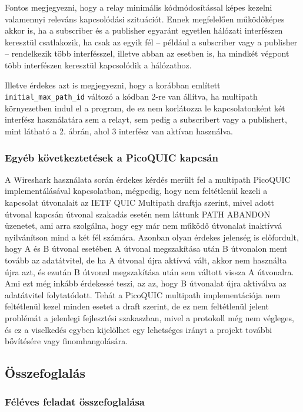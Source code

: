 \documentclass[a4paper,oneside]{article}
\begin{document}
Fontos megjegyezni, hogy a relay minimális kódmódosítással képes kezelni valamennyi 
releváns kapcsolódási szituációt. Ennek megfelelően működőképes akkor is, ha a subscriber és a 
publisher egyaránt egyetlen hálózati interfészen keresztül csatlakozik, ha csak az egyik 
fél – például a subscriber vagy a publisher – rendelkezik több interfésszel, illetve abban 
az esetben is, ha mindkét végpont több interfészen keresztül kapcsolódik a hálózathoz.


Illetve érdekes azt is megjegyezni, hogy a korábban említett 
  \texttt{initial\_max\_path\_id}
változó a kódban 2-re van állítva, ha multipath környezetben indul el a program,
de ez nem korlátozza le kapcsolatonként két interfész használatára sem a relayt, sem pedig a 
subscribert vagy a publishert, mint látható a 2. ábrán, ahol 3 interfész van aktívan használva.

\subsubsection{Egyéb következtetések a PicoQUIC kapcsán}

A Wireshark használata során érdekes kérdés merült fel a multipath PicoQUIC implementálásával kapcsolatban,
mégpedig, hogy nem feltétlenül kezeli a kapcsolat útvonalait az IETF QUIC Multipath draftja szerint, mivel adott útvonal kapcsán útvonal szakadás 
esetén nem láttunk PATH ABANDON üzenetet, ami arra szolgálna, hogy egy már nem működő útvonalat inaktívvá nyilvánítson mind a két fél számára.
Azonban olyan érdekes jelenség is előfordult, hogy A és B útvonal esetében A útvonal megszakítása után B útvonalon ment tovább az adatátvitel,
de ha A útvonal újra aktívvá vált, akkor nem használta újra azt, és ezután B útvonal megszakítása után sem váltott vissza A útvonalra. Ami ezt még inkább érdekessé 
teszi, az az, hogy B útvonalat újra aktiválva az adatátvitel folytatódott. Tehát a PicoQUIC multipath implementációja nem feltétlenül
kezel minden esetet a draft szerint, de ez nem feltétlenül jelent problémát a jelenlegi fejlesztési szakaszban, 
mivel a protokoll még nem végleges, és ez a viselkedés egyben kijelölhet egy lehetséges irányt a projekt további bővítésére vagy finomhangolására.

\subsection{Összefoglalás}
\label{sec:osszefoglalas}

\subsubsection{Féléves feladat összefoglalása}
\end{document}
